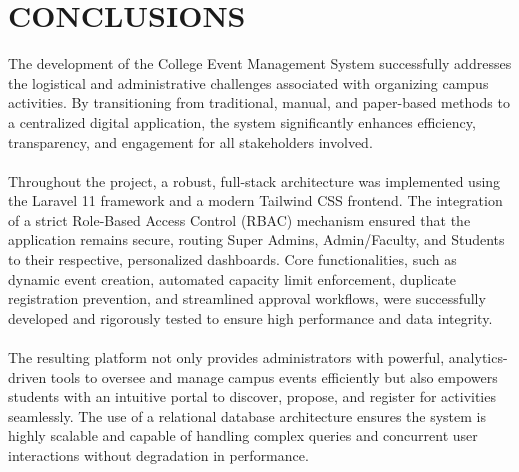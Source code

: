 \chapter{CONCLUSIONS}

The development of the College Event Management System successfully addresses the logistical and administrative challenges associated with organizing campus activities. By transitioning from traditional, manual, and paper-based methods to a centralized digital application, the system significantly enhances efficiency, transparency, and engagement for all stakeholders involved. 
\\\\
Throughout the project, a robust, full-stack architecture was implemented using the Laravel 11 framework and a modern Tailwind CSS frontend. The integration of a strict Role-Based Access Control (RBAC) mechanism ensured that the application remains secure, routing Super Admins, Admin/Faculty, and Students to their respective, personalized dashboards. Core functionalities, such as dynamic event creation, automated capacity limit enforcement, duplicate registration prevention, and streamlined approval workflows, were successfully developed and rigorously tested to ensure high performance and data integrity.
\\\\
The resulting platform not only provides administrators with powerful, analytics-driven tools to oversee and manage campus events efficiently but also empowers students with an intuitive portal to discover, propose, and register for activities seamlessly. The use of a relational database architecture ensures the system is highly scalable and capable of handling complex queries and concurrent user interactions without degradation in performance.
\\\\
